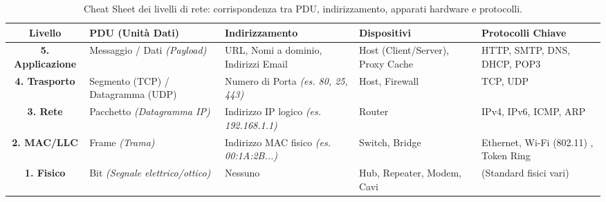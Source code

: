 \documentclass[a4paper,12pt]{report}
\renewcommand{\arraystretch}{1.2} %
\begin{document}
\vspace{0.3cm}

\begin{table}[H]
\centering
\renewcommand{\arraystretch}{1.5} %
\begin{tabular}{|c|p{3.2cm}|p{3.2cm}|p{2.8cm}|p{3.2cm}|}
\hline

\textbf{Livello} & \textbf{PDU (Unità Dati)} & \textbf{Indirizzamento} & \textbf{Dispositivi} & \textbf{Protocolli Chiave} \\
\hline
\textbf{5. Applicazione} & Messaggio / Dati \newline \textit{(Payload)} & URL, Nomi a dominio, Indirizzi Email & Host (Client/Server), Proxy Cache & HTTP, SMTP, DNS, DHCP, POP3  \\
\hline
\textbf{4. Trasporto} & Segmento (TCP) / Datagramma (UDP) & Numero di Porta \newline \textit{(es. 80, 25, 443)} & Host, Firewall & TCP, UDP  \\
\hline
\textbf{3. Rete} & Pacchetto \newline \textit{(Datagramma IP)} & Indirizzo IP logico \newline \textit{(es. 192.168.1.1)} & Router & IPv4, IPv6, ICMP, ARP  \\
\hline
\textbf{2. MAC/LLC} & Frame \newline \textit{(Trama)} & Indirizzo MAC fisico \newline \textit{(es. 00:1A:2B...)} & Switch, Bridge & Ethernet, Wi-Fi (802.11)  , Token Ring \\
\hline
\textbf{1. Fisico} & Bit \newline \textit{(Segnale elettrico/ottico)} & Nessuno & Hub, Repeater, Modem, Cavi & (Standard fisici vari)  \\
\hline
\end{tabular}
\caption{Cheat Sheet dei livelli di rete: corrispondenza tra PDU, indirizzamento, apparati hardware e protocolli.}
\label{tab:riassunto_livelli_stack}
\end{table}
\end{document}
